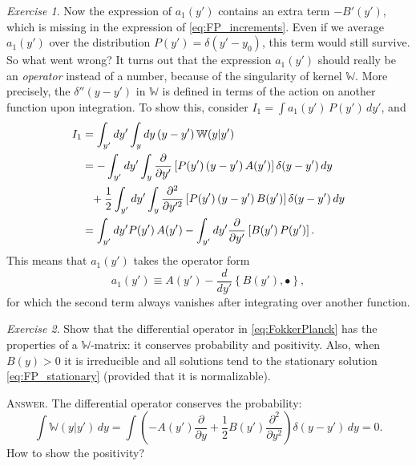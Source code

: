\documentclass{book}
\numberwithin{equation}{section}
\theoremstyle{plain}
\theoremstyle{definition}
\theoremstyle{remark}
\theoremstyle{BoldStyle}
\newtheorem{exercise}{Exercise}
\numberwithin{exercise}{section}
\newcommand{\answer}[1]{{\color{DarkBlue}\footnotesize \textsc{Answer.} #1}}
\begin{document}
\begin{exercise}
{    Now the expression of $a_1(y')$ contains
    an extra term $-B'(y')$,
    which is missing in the expression of \eqref{eq:FP_increments}.
    Even if we average $a_1(y')$ over the distribution
    $P(y') = \delta(y' - y_0)$,
    this term would still survive.
    So what went wrong?
    It turns out that the expression $a_1(y')$ should really be an \emph{operator}
    instead of a number, because of the singularity of kernel $\mathbb W$.
    More precisely, the $\delta''(y - y')$ in $\mathbb W$
    is defined in terms of the action on another function upon integration.
    To show this, consider $I_1 = \int a_1(y') \, P(y') \, dy'$, and
    $$
    \begin{aligned}
    I_1
    &=
    \int_{y'} d y' \int_y dy \, (y - y') \, \mathbb W(y|y')
    \\
    &=
    -
    \int_{y'} dy'
    \int_y
      \frac{\partial }{\partial y' }
      \left[ P(y') \, (y - y') \, A(y') \right]
      \delta(y - y') \, dy
    \\
    &\hphantom{=}
    +
      \frac 1 2
    \int_{y'} dy'
    \int_y
      \frac{ \partial^2 } { \partial y'^2 }
      \left[ P(y') \, (y - y') \, B(y') \right]
      \delta(y - y') \, dy
    \\
    &=
    \int_{y'} dy'
      P(y') \, A(y')
    -
    \int_{y'} dy'
      \frac{ \partial } { \partial y' }
      \left[ B(y') \, P(y') \right].
    \end{aligned}
    $$
    This means that $a_1(y')$ takes the operator form
    $$
    a_1(y') \equiv A(y') - \frac{d}{d y'} \left\{ B(y'), \bullet \right\},
    $$
    for which the second term always vanishes
    after integrating over another function.
  }
\end{exercise}

\begin{exercise}
  Show that the differential operator in \eqref{eq:FokkerPlanck}
  has the properties of a $\mathbb W$-matrix:
  it conserves probability and positivity.
  Also, when $B(y) > 0$ it is irreducible and all solutions
  tend to the stationary solution \eqref{eq:FP_stationary}
  (provided that it is normalizable).

  \answer{
    The differential operator conserves the probability:
    $$
    \int \mathbb W(y|y') \, dy
    =
    \int \left(
      -A(y') \frac{\partial }{\partial y }
      +
      \frac 1 2
      B(y')
      \frac{ \partial^2 } { \partial y^2 }
    \right)
    \delta(y - y') \, dy = 0.
    $$
    How to show the positivity?
  }
\end{exercise}
\end{document}
